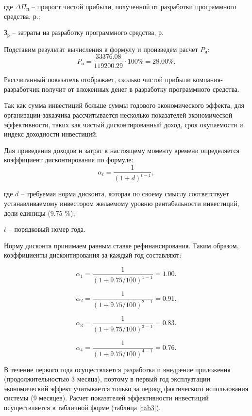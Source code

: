 где $\Delta\Pi_{\text{п}}$ -- прирост чистой прибыли, полученной от разработки программного средства, р.;

    $\text{З}_{\text{р}}$ -- затраты на разработку программного средства, р.

Подставим результат вычисления в формулу и произведем расчет $P_{\text{и}}$:
$$
    P_{\text{и}} = \frac{33376.08}{119200.29} \cdot 100\% = 28.00 \%.
$$

Рассчитанный показатель отображает, сколько чистой прибыли компания-разработчик получит от вложенных денег в разработку программного средства.

Так как сумма инвестиций больше суммы годового экономического эффекта, для организации-заказчика рассчитывается несколько показателей экономической эффективности, таких как чистый дисконтированный доход, срок окупаемости и индекс доходности инвестиций.

Для приведения доходов и затрат к настоящему моменту времени определяется коэффициент дисконтирования по формуле:
\begin{equation}
    \alpha _{t} = \frac{1}{(1 + d)^{t-1}},
\end{equation}

где $d$ -- требуемая норма дисконта, которая по своему смыслу соответствует устанавливаемому инвестором желаемому уровню рентабельности инвестиций, доли единицы (9.75 \%);

    $t$ -- порядковый номер года.

Норму дисконта принимаем равным ставке рефинансирования. Таким образом, коэффициенты дисконтирования за каждый год составляют:

$$ \alpha _{1} = \frac{1}{(1 + 9.75 / 100)^{1-1}} = 1.00. $$

$$ \alpha _{2} = \frac{1}{(1 + 9.75 / 100)^{2-1}} = 0.91. $$

$$ \alpha _{3} = \frac{1}{(1 + 9.75 / 100)^{3-1}} = 0.83. $$

$$ \alpha _{4} = \frac{1}{(1 + 9.75 / 100)^{4-1}} = 0.76. $$


В течение первого года осуществляется разработка и внедрение приложения (продолжительностью 3 месяца), поэтому в первый год эксплуатации экономический эффект учитывается только за период фактического использования системы (9 месяцев). Расчет показателей эффективности инвестиций осуществляется в табличной форме (таблица \ref{tab3}).

